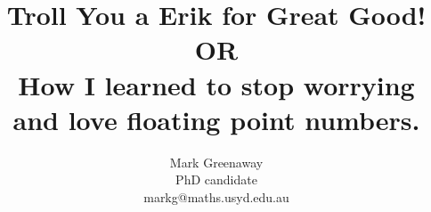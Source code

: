 \documentclass{beamer}
\title{Troll You a Erik for Great Good!\\OR\\How I learned to stop worrying and love floating point numbers.}
\author{Mark Greenaway \\ PhD candidate \\ markg@maths.usyd.edu.au}
\begin{document}
\begin{frame}
\maketitle
\end{frame}




\end{document}
